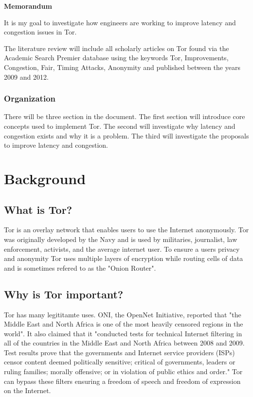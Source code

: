 \documentclass[letterpaper,12pt]{texMemo}
\begin{document}
\singlespace
\begin{center}
\large {\bf Memorandum}
\end{center}
\setlength{\topmargin}{0in}
\maketitle

It is my goal to investigate how engineers are working to improve latency and congestion issues in Tor.

The literature review will include all scholarly articles on Tor found via the Academic Search
Premier database using the keywords Tor, Improvements, Congestion, Fair, Timing Attacks,
Anonymity and published between the years 2009 and 2012.

\subsubsection*{Organization}
There will be three section in the document. The first section will introduce core concepts used to
implement Tor. The second will investigate why latency and congestion exists and why it is a
problem. The third will investigate the proposals to improve latency and congestion.

\section*{Background}

    \subsection*{What is Tor?}
    Tor is an overlay network that enables users to use the Internet anonymously. Tor was originally
    developed by the Navy and is used by militaries, journalist, law enforcement, activists, and the
    average internet user\citep[2]{tor:web}. To ensure a users privacy and anonymity Tor uses multiple
    layers of encryption while routing cells of data and is sometimes refered to as the "Onion Router".

    \subsection*{Why is Tor important?}
    Tor has many legititamte uses. ONI, the OpenNet Initiative, reported that "the Middle East and
    North Africa is one of the most heavily censored regions in the world". It also claimed that it
    "conducted tests for technical Internet filtering in all of the countries in the Middle East
    and North Africa between 2008 and 2009. Test results prove that the governments and Internet
    service providers (ISPs) censor content deemed politically sensitive; critical of governments,
    leaders or ruling families; morally offensive; or in violation of public ethics and order." Tor
    can bypass these filters ensuring a freedom of speech and freedom of expression on the Internet.
\end{document}
